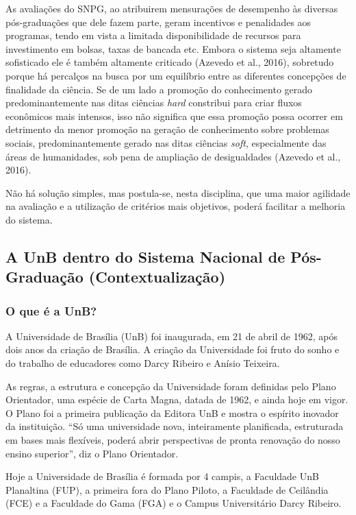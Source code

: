 \documentclass[]{article}
\begin{document}
As avaliações do SNPG, ao atribuirem mensurações de desempenho às
diversas pós-graduações que dele fazem parte, geram incentivos e
penalidades aos programas, tendo em vista a limitada disponibilidade de
recursos para investimento em bolsas, taxas de bancada etc. Embora o
sistema seja altamente sofisticado ele é também altamente criticado
(Azevedo et al., 2016), sobretudo porque há percalços na busca por um
equilíbrio entre as diferentes concepções de finalidade da ciência. Se
de um lado a promoção do conhecimento gerado predominantemente nas ditas
ciências \emph{hard} constribui para criar fluxos econômicos mais
intensos, isso não significa que essa promoção possa ocorrer em
detrimento da menor promoção na geração de conhecimento sobre problemas
sociais, predominantemente gerado nas ditas ciências \emph{soft},
especialmente das áreas de humanidades, sob pena de ampliação de
desigualdades (Azevedo et al., 2016).

Não há solução simples, mas postula-se, nesta disciplina, que uma maior
agilidade na avaliação e a utilização de critérios mais objetivos,
poderá facilitar a melhoria do sistema.

\subsection{A UnB dentro do Sistema Nacional de Pós-Graduação
(Contextualização)}\label{a-unb-dentro-do-sistema-nacional-de-pos-graduacao-contextualizacao}

\subsubsection{O que é a UnB?}\label{o-que-e-a-unb}

A Universidade de Brasília (UnB) foi inaugurada, em 21 de abril de 1962,
após dois anos da criação de Brasília. A criação da Universidade foi
fruto do sonho e do trabalho de educadores como Darcy Ribeiro e Anísio
Teixeira.

As regras, a estrutura e concepção da Universidade foram definidas pelo
Plano Orientador, uma espécie de Carta Magna, datada de 1962, e ainda
hoje em vigor. O Plano foi a primeira publicação da Editora UnB e mostra
o espírito inovador da instituição. ``Só uma universidade nova,
inteiramente planificada, estruturada em bases mais flexíveis, poderá
abrir perspectivas de pronta renovação do nosso ensino superior'', diz o
Plano Orientador.

Hoje a Universidade de Brasília é formada por 4 campis, a Faculdade UnB
Planaltina (FUP), a primeira fora do Plano Piloto, a Faculdade de
Ceilândia (FCE) e a Faculdade do Gama (FGA) e o Campus Universitário
Darcy Ribeiro.
\end{document}
